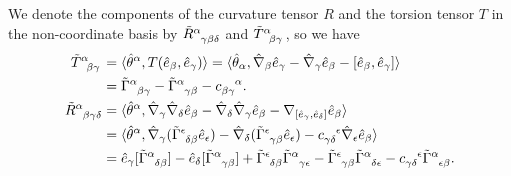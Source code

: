 \documentclass[10pt]{article}
\begin{document}
We denote the components of the curvature tensor $R$ and the torsion tensor $T$ in the non-coordinate basis by $\tensor{\tilde{R}}{^\alpha_\gamma_\beta_\delta}$ and $\tensor{\tilde{T}}{^\alpha_\beta_\gamma}$, so we have
\begin{align}
    \tensor{\tilde{T}}{^\alpha_\beta_\gamma}        & =\langle\hat{\theta}^\alpha,T(\hat{e}_\beta,\hat{e}_\gamma)\rangle=\langle\hat{\theta}_\alpha,\hat{\nabla}_\beta\hat{e}_\gamma-\hat{\nabla}_\gamma\hat{e}_\beta-\comm{\hat{e}_\beta}{\hat{e}_\gamma}\rangle\notag                                                                                                                                                                                                 \\
                                                    & =\tensor{\tilde{\Gamma}}{^\alpha_\beta_\gamma}-\tensor{\tilde{\Gamma}}{^\alpha_\gamma_\beta}-\tensor{c}{_\beta_\gamma^\alpha}.                                                                                                                                                                                                                                                                                    \\
    \tensor{\tilde{R}}{^\alpha_\beta_\gamma_\delta} & =\langle\hat{\theta}^\alpha,\hat{\nabla}_\gamma\hat{\nabla}_\delta\hat{e}_\beta-\hat{\nabla}_\delta\hat{\nabla}_\gamma\hat{e}_\beta-\nabla_{\comm{\hat{e}_\gamma}{\hat{e}_{\delta}}}\hat{e}_\beta\rangle\notag                                                                                                                                                                                                    \\
                                                    & =\langle\hat{\theta}^\alpha,\hat{\nabla}_\gamma(\tensor{\tilde{\Gamma}}{^\epsilon_\delta_\beta}\hat{e}_\epsilon)-\hat{\nabla}_\delta(\tensor{\tilde{\Gamma}}{^\epsilon_\gamma_\beta}\hat{e}_\epsilon)-\tensor{c}{_\gamma_\delta^\epsilon}\hat{\nabla}_\epsilon\hat{e}_\beta\rangle\notag                                                                                                                          \\
                                                    & = \hat{e}_\gamma[\tensor{\tilde{\Gamma}}{^\alpha_\delta_\beta}]-\hat{e}_\delta[\tensor{\tilde{\Gamma}}{^\alpha_\gamma_\beta}]+\tensor{\tilde{\Gamma}}{^\epsilon_\delta_\beta}\tensor{\tilde{\Gamma}}{^\alpha_\gamma_\epsilon}-\tensor{\tilde{\Gamma}}{^\epsilon_\gamma_\beta}\tensor{\tilde{\Gamma}}{^\alpha_\delta_\epsilon}-\tensor{c}{_\gamma_\delta^\epsilon}\tensor{\tilde{\Gamma}}{^\alpha_\epsilon_\beta}.\label{eq:noncoordinatecurvature}
\end{align}
\end{document}
